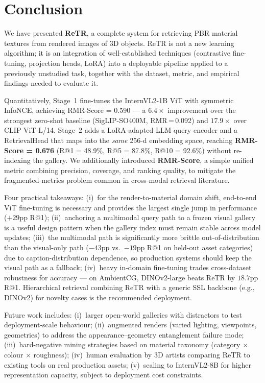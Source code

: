 \documentclass[10pt,twocolumn]{article}
\begin{document}
\section{Conclusion}

We have presented \textbf{ReTR}, a complete system for retrieving PBR
material textures from rendered images of 3D objects.
ReTR is not a new learning algorithm; it is an integration of well-established
techniques (contrastive fine-tuning, projection heads, LoRA) into a deployable
pipeline applied to a previously unstudied task, together with the dataset,
metric, and empirical findings needed to evaluate it.

Quantitatively, Stage~1 fine-tunes the InternVL2-1B ViT with symmetric
InfoNCE, achieving RMR-Score = 0.590 --- a $6.4\times$ improvement over the
strongest zero-shot baseline (SigLIP-SO400M, RMR\,=\,0.092) and
$17.9\times$ over CLIP ViT-L/14.
Stage~2 adds a LoRA-adapted LLM query encoder and a RetrievalHead that maps
into the \emph{same} 256-d embedding space, reaching
\textbf{RMR-Score = 0.676} (R@1 = 48.9\%, R@5 = 87.8\%, R@10 = 92.6\%)
without re-indexing the gallery.
We additionally introduced \textbf{RMR-Score}, a simple unified metric
combining precision, coverage, and ranking quality, to mitigate the
fragmented-metrics problem common in cross-modal retrieval literature.

Four practical takeaways:
(i)~for the render-to-material domain shift, end-to-end ViT fine-tuning is
necessary and provides the largest single jump in performance ($+29$pp R@1);
(ii)~anchoring a multimodal query path to a frozen visual gallery is a
useful design pattern when the gallery index must remain stable across
model updates;
(iii)~the multimodal path is significantly more brittle out-of-distribution
than the visual-only path ($-43$pp vs.\ $-19$pp R@1 on held-out asset
categories) due to caption-distribution dependence, so production systems
should keep the visual path as a fallback;
(iv)~heavy in-domain fine-tuning trades cross-dataset robustness for
accuracy --- on AmbientCG, DINOv2-large beats ReTR by $18.7$pp R@1.
Hierarchical retrieval combining ReTR with a generic SSL backbone
(e.g., DINOv2) for novelty cases is the recommended deployment.

Future work includes: (i)~larger open-world galleries with distractors to
test deployment-scale behaviour;
(ii)~augmented renders (varied lighting, viewpoints, geometries) to address
the appearance--geometry entanglement failure mode;
(iii)~hard-negative mining strategies based on material taxonomy
(category $\times$ colour $\times$ roughness);
(iv)~human evaluation by 3D artists comparing ReTR to existing tools on
real production assets;
(v)~scaling to InternVL2-8B for higher representation capacity, subject to
deployment cost constraints.
\end{document}
